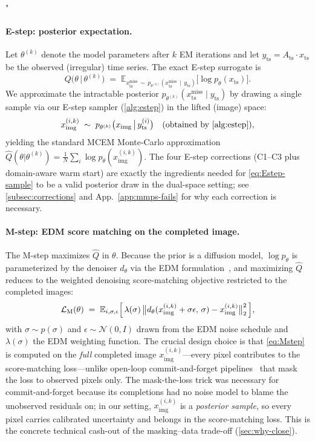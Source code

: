 "\documentclass{article}
\theoremstyle{plain}
\theoremstyle{definition}
\theoremstyle{remark}
\newcommand{\Ats}{A_{\mathrm{ts}}}
\newcommand{\yts}{y_{\mathrm{ts}}}
\newcommand{\xts}{x_{\mathrm{ts}}}
\newcommand{\ximg}{x_{\mathrm{img}}}
\begin{document}
\paragraph{E-step: posterior expectation.}
Let $\theta^{(k)}$ denote the model parameters after $k$ EM iterations and let $\yts = \Ats \cdot \xts$ be the observed (irregular) time series. The exact E-step surrogate is
\begin{equation}
Q\bigl(\theta \,\big|\, \theta^{(k)}\bigr) \;=\; \mathbb{E}_{\xts^{\mathrm{miss}} \,\sim\, p_{\theta^{(k)}}(\xts^{\mathrm{miss}} \,\mid\, \yts)} \bigl[\log p_\theta(\xts)\bigr].
\label{eq:Q-surrogate}
\end{equation}
We approximate the intractable posterior $p_{\theta^{(k)}}(\xts^{\mathrm{miss}} \mid \yts)$ by drawing a single sample via our E-step sampler (\cref{alg:estep}) in the lifted (image) space:
\begin{equation}
\ximg^{(i,k)} \;\sim\; p_{\theta^{(k)}}\bigl(\ximg \,\big|\, \yts^{(i)}\bigr) \quad \text{(obtained by \cref{alg:estep})},
\label{eq:Estep-sample}
\end{equation}
yielding the standard MCEM Monte-Carlo approximation $\hat{Q}(\theta | \theta^{(k)}) = \frac{1}{N} \sum_i \log p_\theta(\ximg^{(i,k)})$. The four E-step corrections (C1--C3 plus domain-aware warm start) are exactly the ingredients needed for \cref{eq:Estep-sample} to be a valid posterior draw in the dual-space setting; see \cref{subsec:corrections} and App.~\ref{app:mmps-fails} for why each correction is necessary.

\paragraph{M-step: EDM score matching on the completed image.}
The M-step maximizes $\hat{Q}$ in $\theta$. Because the prior is a diffusion model, $\log p_\theta$ is parameterized by the denoiser $d_\theta$ via the EDM formulation~\citep{karras2022edm}, and maximizing $\hat{Q}$ reduces to the weighted denoising score-matching objective restricted to the completed images:
\begin{equation}
\mathcal{L}_{\mathrm{M}}(\theta) \;=\; \mathbb{E}_{i, \sigma, \epsilon} \Bigl[\, \lambda(\sigma) \, \bigl\| d_\theta(\ximg^{(i,k)} + \sigma \epsilon,\, \sigma) - \ximg^{(i,k)} \bigr\|_2^2 \,\Bigr],
\label{eq:Mstep}
\end{equation}
with $\sigma \sim p(\sigma)$ and $\epsilon \sim \mathcal{N}(0, I)$ drawn from the EDM noise schedule and $\lambda(\sigma)$ the EDM weighting function. The crucial design choice is that \cref{eq:Mstep} is computed on the \emph{full} completed image $\ximg^{(i,k)}$---every pixel contributes to the score-matching loss---unlike open-loop commit-and-forget pipelines~\citep{fadlon2025imageni2r} that mask the loss to observed pixels only. The mask-the-loss trick was necessary for commit-and-forget because its completions had no noise model to blame the unobserved residuals on; in our setting, $\ximg^{(i,k)}$ is a \emph{posterior sample}, so every pixel carries calibrated uncertainty and belongs in the score-matching loss. This is the concrete technical cash-out of the masking--data trade-off (\cref{sec:why-close}).
\end{document}
